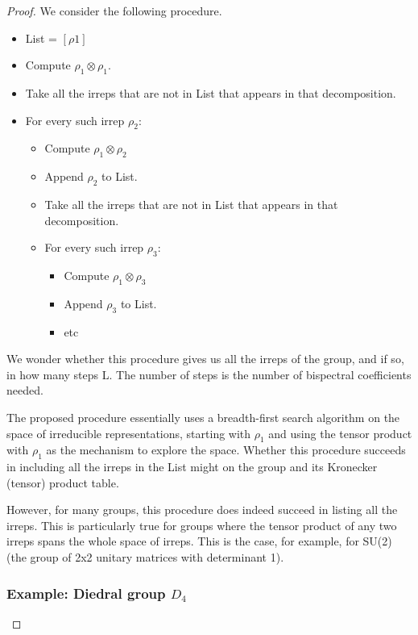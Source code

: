 \documentclass{article}
\begin{document}
\begin{proof}
    We consider the following procedure.
    \begin{itemize}
        \item List = $[\rho1]$
        \item Compute $\rho_1 \otimes \rho_1$.
        \item Take all the irreps that are not in List that appears in that decomposition.
        \item For every such irrep $\rho_2$:
        \begin{itemize}
            \item Compute $\rho_1 \otimes \rho_2$
            \item Append $\rho_2$ to List.
            \item Take all the irreps that are not in List that appears in that decomposition.
            \item For every such irrep $\rho_3$:
            \begin{itemize}
                \item Compute $\rho_1 \otimes \rho_3$
                \item Append $\rho_3$ to List.
                \item etc
            \end{itemize}
        \end{itemize}
    \end{itemize}

    We wonder whether this procedure gives us all the irreps of the group, and if so, in how many steps L. The number of steps is the number of bispectral coefficients needed.

    The proposed procedure essentially uses a breadth-first search algorithm on the space of irreducible representations, starting with $\rho_1$ and using the tensor product with $\rho_1$ as the mechanism to explore the space. Whether this procedure succeeds in including all the irreps in the List might on the group and its Kronecker (tensor) product table.

    However, for many groups, this procedure does indeed succeed in listing all the irreps. This is particularly true for groups where the tensor product of any two irreps spans the whole space of irreps. This is the case, for example, for SU(2) (the group of 2x2 unitary matrices with determinant 1).

\subsubsection{Example: Diedral group $D_4$}


\end{proof}
\end{document}
